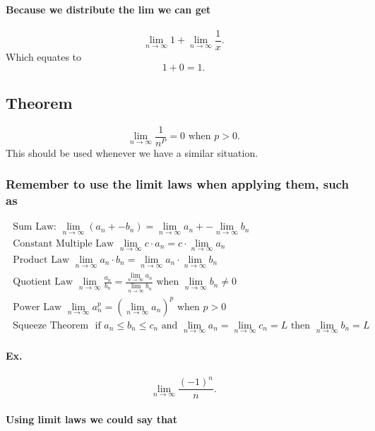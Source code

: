 \paragraph{Because we distribute the lim we can get}

\[
\lim_{n \to \infty} 1 + \lim_{n \to \infty} \frac{1}{x}
.\] 
Which equates to 
\[
1+0=1
.\] 

\subsection{Theorem}%
\label{sub:Theorem}
\[
\lim_{n \to \infty} \frac{1}{n^{P}}=0 \text{ when }p>0
.\] 
This should be used whenever we have a similar situation. 

\subsubsection{Remember to use the limit laws when applying them, such as}

\begin{gather*}
\text{ Sum Law: } \lim_{n \to \infty} \left( a_n+-b_n \right) = \lim_{n \to \infty} a_n +- \lim_{n \to \infty} b_n\\
\text{ Constant Multiple Law } \lim_{n \to \infty} c\cdot a_n = c\cdot \lim_{n \to \infty} a_n\\
\text{ Product Law } \lim_{n \to \infty} a_n\cdot b_n = \lim_{n \to \infty} a_n \cdot \lim_{n \to \infty} b_n\\
\text{ Quotient Law } \lim_{n \to \infty} \frac{a_n}{b_n} = \frac{\lim_{n \to \infty} a_n}{\lim_{n \to \infty} b_n} \text{ when } \lim_{n \to \infty} b_n \neq 0\\
\text{ Power Law } \lim_{n \to \infty} a_n^{p} = \left( \lim_{n \to \infty} a_n \right) ^{p} \text{ when } p>0\\
\text{ Squeeze Theorem } \text{ if } a_n \leq b_n \leq c_n \text{ and } \lim_{n \to \infty} a_n = \lim_{n \to \infty} c_n = L \text{ then } \lim_{n \to \infty} b_n = L
\end{gather*}
\newpage
\paragraph{Ex.}
\[
\lim_{n \to \infty} \frac{\left( -1 \right) ^{n}}{n}
.\] 

\paragraph{Using limit laws we could say that }

